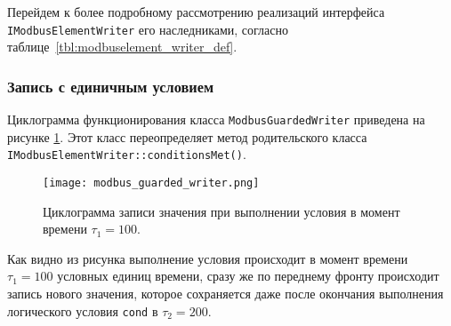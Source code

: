 Перейдем к более подробному рассмотрению реализаций интерфейса \texttt{IModbusElementWriter} его наследниками,
согласно таблице~\ref{tbl:modbuselement_writer_def}.

\subsubsection{Запись с единичным условием}\label{sec:guard}
Циклограмма функционирования класса \texttt{ModbusGuardedWriter} приведена на рисунке \ref{fig:modbus_guarded_writed}.
Этот класс переопределяет метод родительского класса \texttt{IModbusElementWriter::conditionsMet()}.
\begin{figure}[h!]\begin{center}
    \texttt{[image: modbus\_guarded\_writer.png]}
    \caption[Циклограмма записи значения для единичного условия]
        {Циклограмма записи значения при выполнении условия в момент времени $\tau_1=100$.}
            \label{fig:modbus_guarded_writed}
\end{center}\end{figure}

Как видно из рисунка выполнение условия происходит в момент времени $\tau_1=100$ условных единиц времени,
сразу же по переднему фронту происходит запись нового значения, которое сохраняется даже после окончания
выполнения логического условия \texttt{cond} в $\tau_2=200$.



